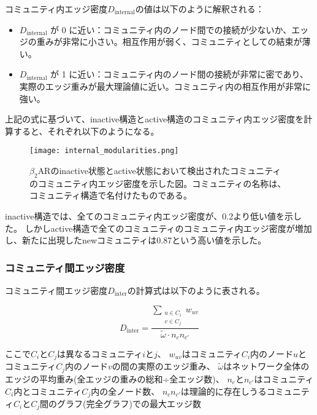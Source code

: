 コミュニティ内エッジ密度$D_{\text{internal}}$の値は以下のように解釈される：
\begin{itemize}
    \item \( D_{\text{internal}} \) が 0 に近い：コミュニティ内のノード間での接続が少ないか、エッジの重みが非常に小さい。相互作用が弱く、コミュニティとしての結束が薄い。
    \item \( D_{\text{internal}} \) が 1 に近い：コミュニティ内のノード間の接続が非常に密であり、実際のエッジ重みが最大理論値に近い。コミュニティ内の相互作用が非常に強い。
\end{itemize}

上記の式に基づいて、inactive構造とactive構造のコミュニティ内エッジ密度を計算すると、それぞれ以下のようになる。

\begin{figure}[htbp]
    \centering
    \texttt{[image: internal\_modularities.png]}
    \caption{$\beta_2$ARのinactive状態とactive状態において検出されたコミュニティのコミュニティ内エッジ密度を示した図。コミュニティの名称は、コミュニティ構造で名付けたものである。}
    \label{fig:internal}
\end{figure}

\newpage

inactive構造では、全てのコミュニティ内エッジ密度が、0.2より低い値を示した。
しかしactive構造で全てのコミュニティのコミュニティ内エッジ密度が増加し、新たに出現したnewコミュニティは0.87という高い値を示した。

\subsubsection{コミュニティ間エッジ密度}
コミュニティ間エッジ密度$D_{\text{inter}}$の計算式は以下のように表される。

\begin{equation}
D_{\text{inter}} = \frac{\sum_{\substack{u \in C_i \\ v \in C_j}} w_{uv}}{\tilde{\omega} \cdot n_c n_{c'}}
\label{eq:inter_density}
\end{equation}


ここで$C_i$と$C_j$は異なるコミュニティ$i$と$j$、
$w_{uv}$はコミュニティ$C_i$内のノード$u$とコミュニティ$C_j$内のノード$v$の間の実際のエッジ重み、
$\tilde{\omega}$はネットワーク全体のエッジの平均重み(全エッジの重みの総和÷全エッジ数)、
$n_c$と$n_{c'}$はコミュニティ$C_i$内とコミュニティ$C_j$内の全ノード数、
$n_c n_{c'}$は理論的に存在しうるコミュニティ$C_i$と$C_j$間のグラフ(完全グラフ)での最大エッジ数

